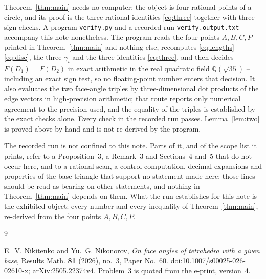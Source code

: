\documentclass[11pt]{amsart}
\theoremstyle{remark}
\begin{document}
Theorem~\ref{thm:main} needs no computer: the object is four rational points of a circle, and its proof
is the three rational identities \eqref{eq:three} together with three sign checks. A
program \texttt{verify.py} and a recorded run \texttt{verify.output.txt} accompany this note
nonetheless. The program reads the four points $A,B,C,P$ printed in Theorem~\ref{thm:main}
and nothing else, recomputes \eqref{eq:lengths}--\eqref{eq:disc}, the three $\gamma_i$ and
the three identities \eqref{eq:three}, and then decides $F(D_1)=F(D_2)$ in exact arithmetic
in the real quadratic field $\mathbb Q(\sqrt{35})$ -- including an exact sign test, so no
floating-point number enters that decision. It also evaluates the two face-angle triples by
three-dimensional dot products of the edge vectors in high-precision arithmetic; that route
reports only numerical agreement to the precision used, and the equality of the triples is
established by the exact checks alone. Every check in the recorded run passes.
Lemma~\ref{lem:two} is proved above by hand and is not re-derived by the program.

The recorded run is not confined to this note. Parts of it, and of the scope list it prints,
refer to a Proposition~3, a Remark~3 and Sections~4 and~5 that do not occur here, and to a
rational scan, a control computation, decimal expansions and properties of the base triangle
that support no statement made here; those lines should be read as bearing on other
statements, and nothing in Theorem~\ref{thm:main} depends on them. What the run establishes for this note is the
exhibited object: every number and every inequality of Theorem~\ref{thm:main}, re-derived
from the four points $A,B,C,P$.

\begin{thebibliography}{9}

E.~V. Nikitenko and Yu.~G. Nikonorov,
\emph{On face angles of tetrahedra with a given base},
Results Math. \textbf{81} (2026), no.~3, Paper No.~60.
\href{https://doi.org/10.1007/s00025-026-02610-x}{doi:10.1007/s00025-026-02610-x};
\href{https://arxiv.org/abs/2505.22374v4}{arXiv:2505.22374v4}.
Problem~3 is quoted from the e-print, version~4.

\end{thebibliography}
\end{document}
